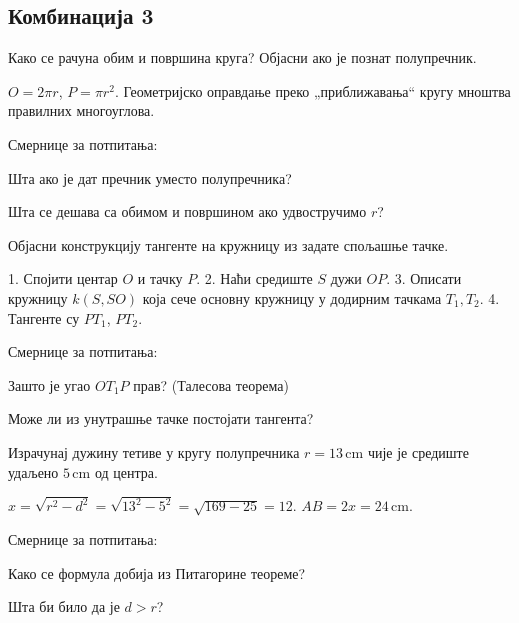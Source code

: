 \documentclass[12pt]{exam}
\begin{document}
\subsection*{Комбинација 3}
\begin{questions}
\question Како се рачуна обим и површина круга? Објасни ако је познат полупречник.
\begin{solution}
$O=2\pi r$, $P=\pi r^2$.
Геометријско оправдање преко „приближавања“ кругу мноштва правилних многоуглова.

Смернице за потпитања:
  \par Шта ако је дат пречник уместо полупречника?
  \par Шта се дешава са обимом и површином ако удвостручимо $r$?
\end{solution}

\question Објасни конструкцију тангенте на кружницу из задате
спо\-ља\-шње тачке.
\begin{solution}
 
1. Спојити центар $O$ и тачку $P$.  
2. Наћи средиште $S$ дужи $OP$.  
3. Описати кружницу $k(S,SO)$ која сече основну кружницу у додирним тачкама $T_1,T_2$.  
4. Тангенте су $PT_1$, $PT_2$.  

Смернице за потпитања:
  \par Зашто је угао $OT_1P$ прав? (Талесова теорема)
  \par Може ли из унутрашње тачке постојати тангента?
\end{solution}

\question Израчунај дужину тетиве у кругу полупречника $r=13\,\mathrm{cm}$ чије је средиште удаљено $5\,\mathrm{cm}$ од центра.
\begin{solution}
$x=\sqrt{r^2-d^2}=\sqrt{13^2-5^2}=\sqrt{169-25}=12$.  
$AB=2x=24\,\mathrm{cm}$.

Смернице за потпитања:
  \par Како се формула добија из Питагорине теореме?
  \par Шта би било да је $d>r$?
\end{solution}
\end{questions}

\ifprintanswers\newpage\else\fi

\end{document}
